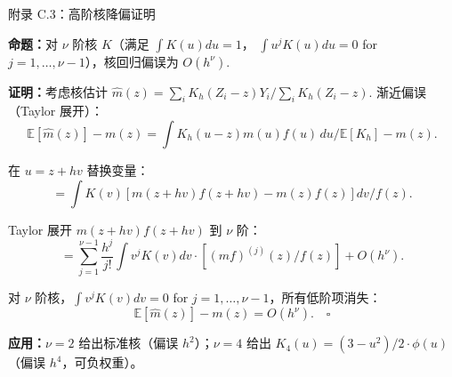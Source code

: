 \documentclass[aspectratio=169, 10pt]{beamer}
\begin{document}
\begin{frame}[shrink=10]{附录 C.3：高阶核降偏证明}
  \hypertarget{proof-c3}{}

  \textbf{命题：}对 $\nu$ 阶核 $K$（满足 $\int K(u) du = 1$，
  $\int u^j K(u) du = 0$ for $j = 1, \ldots, \nu - 1$），核回归偏误为 $O(h^\nu)$.

  \textbf{证明：}考虑核估计 $\hat m(z) = \sum_i K_h(Z_i - z) Y_i / \sum_i K_h(Z_i - z)$.
  渐近偏误（Taylor 展开）：
  $$\mathbb{E}[\hat m(z)] - m(z) = \int K_h(u - z) m(u) f(u)\, du / \mathbb{E}[K_h] - m(z).$$

  在 $u = z + h v$ 替换变量：
  $$= \int K(v) [m(z + hv) f(z + hv) - m(z) f(z)] dv / f(z).$$

  Taylor 展开 $m(z+hv) f(z+hv)$ 到 $\nu$ 阶：
  $$= \sum_{j=1}^{\nu-1} \frac{h^j}{j!} \int v^j K(v) dv \cdot [(mf)^{(j)}(z) / f(z)] + O(h^\nu).$$

  对 $\nu$ 阶核，$\int v^j K(v) dv = 0$ for $j = 1, \ldots, \nu - 1$，所有低阶项消失：
  $$\mathbb{E}[\hat m(z)] - m(z) = O(h^\nu). \quad \square$$

  \begin{keybox}
    \textbf{应用：}$\nu = 2$ 给出标准核（偏误 $h^2$）；$\nu = 4$ 给出
    $K_4(u) = (3 - u^2)/2 \cdot \phi(u)$（偏误 $h^4$，可负权重）。
  \end{keybox}
  \hfill{\scriptsize\hyperlink{main-c3}{}}

\end{frame}
\end{document}
